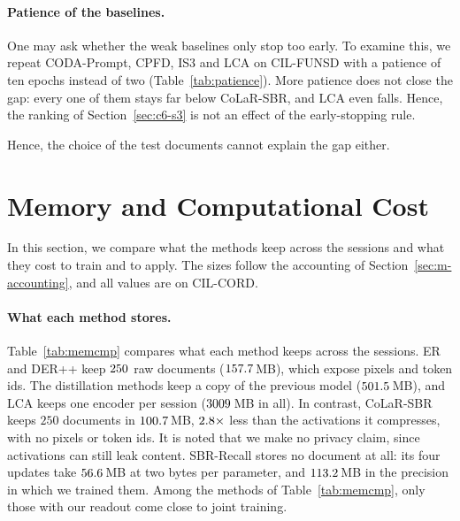 \begin{table}[!htbp]
  \centering
  \caption[The hypothesis rows on BROS]{\textbf{The hypothesis rows on BROS} (CIL-CORD;
  mean $\pm$ s.d.). $^{r}$Uses the ground-truth labels of the stored documents.}
  \label{tab:bros}
  
\end{table}

\paragraph{Patience of the baselines.} One may ask whether the weak baselines only stop
too early. To examine this, we repeat CODA-Prompt, CPFD, IS3 and LCA on CIL-FUNSD with a
patience of ten epochs instead of two (Table~\ref{tab:patience}). More patience does not
close the gap: every one of them stays far below CoLaR-SBR, and LCA even falls. Hence, the
ranking of Section~\ref{sec:c6-s3} is not an effect of the early-stopping rule.

\begin{table}[!htbp]
  \centering
  \caption[Patience of the baselines on CIL-FUNSD]{\textbf{Patience of the baselines} on
  CIL-FUNSD (AA; mean $\pm$ s.d.; ``--'': not run).}
  \label{tab:patience}
  
\end{table}


Hence, the choice of the test documents cannot explain the gap either.

\section{Memory and Computational Cost}
\label{sec:c6-s7}

In this section, we compare what the methods keep across the sessions and what they cost
to train and to apply. The sizes follow the accounting of Section~\ref{sec:m-accounting},
and all values are on CIL-CORD.

\paragraph{What each method stores.} Table~\ref{tab:memcmp} compares what each method
keeps across the sessions. ER and DER++ keep $250$ raw documents ($157.7$\,MB),
which expose pixels and token ids. The distillation methods keep a copy of the previous
model ($501.5$\,MB), and LCA keeps one encoder per session ($3009$\,MB in
all). In contrast, CoLaR-SBR keeps $250$ documents in $100.7$\,MB,
$2.8\times$ less than the activations it compresses, with no pixels or
token ids. It is noted that we make no privacy claim, since activations can still leak
content. SBR-Recall stores no document at all: its four updates take $56.6$\,MB at
two bytes per parameter, and $113.2$\,MB in the precision in which we trained
them. Among the methods of Table~\ref{tab:memcmp}, only those with our readout come close
to joint training.

